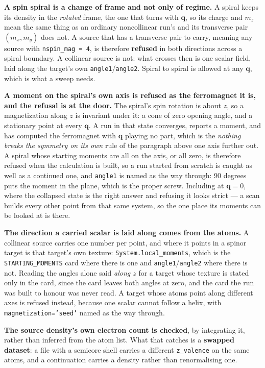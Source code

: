 \documentclass[11pt,a4paper]{article}
\newcommand{\code}[1]{\texttt{\small #1}}
\begin{document}
\begin{refuses}
\textbf{A spin spiral is a change of frame and not only of regime.} A spiral
keeps its density in the \emph{rotated} frame, the one that turns with
$\mathbf q$, so its charge and $m_z$ mean the same thing as an ordinary
noncollinear run's and its transverse pair $(m_x, m_y)$ does not. A source that
has a transverse pair to carry, meaning any source with
\code{nspin\_mag = 4}, is therefore \textbf{refused} in both directions
across a spiral boundary. A collinear source is not: what crosses then is one
scalar field, laid along the target's own \code{angle1}/\code{angle2}. Spiral
to spiral is allowed at any $\mathbf q$, which is what a sweep needs.

\textbf{A moment on the spiral's own axis is refused as the ferromagnet it is,
and the refusal is at the door.} The spiral's spin rotation is about $z$, so a
magnetization along $z$ is invariant under it: a cone of zero opening angle, and
a stationary point at every $\mathbf q$. A run in that state converges, reports
a moment, and has computed the ferromagnet with $\mathbf q$ playing no part,
which is the \emph{nothing breaks the symmetry on its own} rule of the paragraph
above one axis further out. A spiral whose starting moments are all on the axis,
or all zero, is therefore refused when the calculation is built, so a run
started from scratch is caught as well as a continued one, and \code{angle1} is
named as the way through: 90 degrees puts the moment in the plane, which is the
proper screw. Including at $\mathbf q = 0$, where the collapsed state is the
right answer and refusing it looks strict --- a scan builds every other point
from that same system, so the one place its moments can be looked at is there.

\textbf{The direction a carried scalar is laid along comes from the atoms.} A
collinear source carries one number per point, and where it points in a spinor
target is that target's own texture: \code{System.local\_moments}, which is the
\code{STARTING\_MOMENTS} card where there is one and \code{angle1}/\code{angle2}
where there is not. Reading the angles alone said \emph{along $z$} for a target
whose texture is stated only in the card, since the card leaves both angles at
zero, and the card the run was built to honour was never read. A target whose
atoms point along different axes is refused instead, because one scalar cannot
follow a helix, with \code{magnetization='seed'} named as the way through.

\textbf{The source density's own electron count is checked}, by integrating it,
rather than inferred from the atom list. What that catches is a \textbf{swapped
dataset}: a file with a semicore shell carries a different \code{z\_valence}
on the same atoms, and a continuation carries a density rather than
renormalising one.


\end{refuses}
\end{document}
